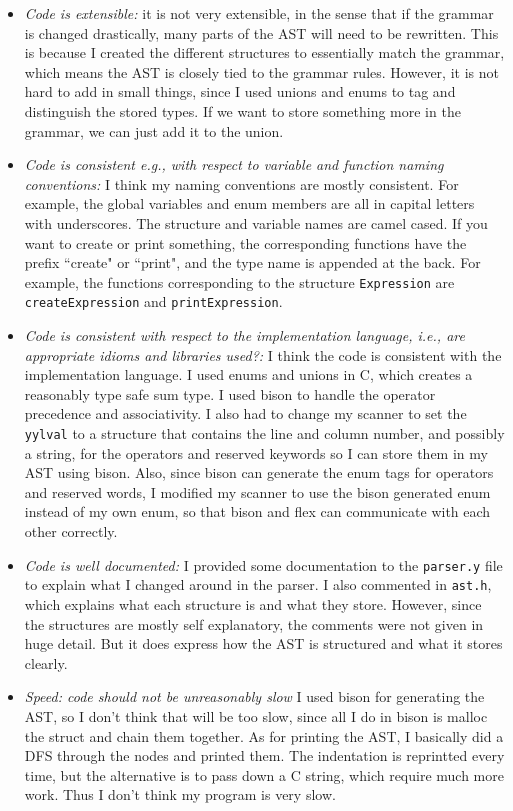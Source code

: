 \documentclass{article}
\begin{document}
\begin{itemize}
    \item \emph{Code is extensible:} it is not very extensible, in the sense that if the grammar is changed drastically, many parts of the AST will need to be rewritten. This is because I created the different structures to essentially match the grammar, which means the AST is closely tied to the grammar rules. However, it is not hard to add in small things, since I used unions and enums to tag and distinguish the stored types. If we want to store something more in the grammar, we can just add it to the union.
    \item \emph{Code is consistent e.g., with respect to variable and function naming conventions:} I think my naming conventions are mostly consistent. For example, the global variables and enum members are all in capital letters with underscores. 
        The structure and variable names are camel cased.
        If you want to create or print something, the corresponding functions have the prefix ``create" or ``print", and the type name is appended at the back.
        For example, the functions corresponding to the structure \verb|Expression| are \verb|createExpression| and \verb|printExpression|.
    \item \emph{Code is consistent with respect to the implementation language, i.e., are appropriate idioms and libraries used?:}
        I think the code is consistent with the implementation language. I used enums and unions in C, which creates a reasonably type safe sum type. I used bison to handle the operator precedence and associativity. I also had to change my scanner to set the \verb|yylval| to a structure that contains the line and column number, and possibly a string, for the operators and reserved keywords so I can store them in my AST using bison. Also, since bison can generate the enum tags for operators and reserved words, I modified my scanner to use the bison generated enum instead of my own enum, so that bison and flex can communicate with each other correctly.

    \item \emph{Code is well documented: } I provided some documentation to the \verb|parser.y| file to explain what I changed around in the parser.
        I also commented in \verb|ast.h|, which explains what each structure is and what they store. However, since the structures are mostly self explanatory, the comments were not given in huge detail. But it does express how the AST is structured and what it stores clearly.

    \item \emph{Speed: code should not be unreasonably slow}
        I used bison for generating the AST, so I don't think that will be too slow, since all I do in bison is malloc the struct and chain them together.
        As for printing the AST, I basically did a DFS through the nodes and printed them. The indentation is reprintted every time, but the alternative is to pass down a C string, which require much more work. Thus I don't think my program is very slow.


\end{itemize}
\end{document}

